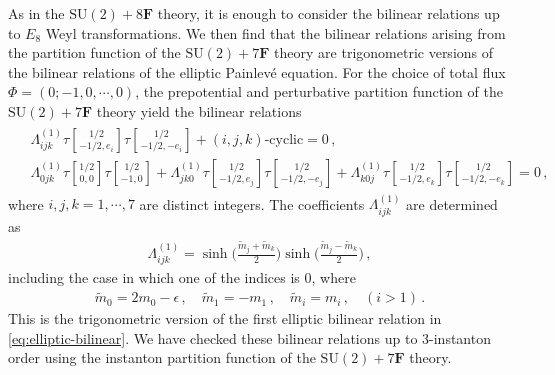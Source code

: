 \documentclass[11pt, a4paper]{article}
\newcommand{\tauftn}[2]{\tau\genfrac[]{0pt}{1}{#1}{#2}}
\theoremstyle{definition}
\begin{document}
As in the $ \mathrm{SU}(2)+8\mathbf{F} $ theory, it is enough to consider the bilinear relations up to $ E_8 $ Weyl transformations. We then find that the bilinear relations arising from the partition function of the $ \mathrm{SU}(2)+7\mathbf{F} $ theory are trigonometric versions of the bilinear relations of the elliptic Painlev\'e equation. For the choice of total flux $ \Phi = (0; -1,0,\cdots,0) $, the prepotential and perturbative partition function of the $ \mathrm{SU}(2)+7\mathbf{F} $ theory yield the bilinear relations
\begin{align}
    \begin{aligned}
        &\Lambda_{ijk}^{(1)} \tauftn{1/2}{-1/2,e_i} \tauftn{1/2}{-1/2,-e_i} + (i,j,k)\text{-cyclic} = 0 \, , \\
        &\Lambda_{0jk}^{(1)}\tauftn{1/2}{0,0} \tauftn{1/2}{-1,0} + \Lambda_{jk0}^{(1)} \tauftn{1/2}{-1/2,e_j} \tauftn{1/2}{-1/2,-e_j} + \Lambda_{k0j}^{(1)} \tauftn{1/2}{-1/2,e_k} \tauftn{1/2}{-1/2,-e_k} = 0  \, ,
    \end{aligned}
\end{align}
where $ i,j,k=1,\cdots,7 $ are distinct integers. The coefficients $ \Lambda_{ijk}^{(1)} $ are determined as
\begin{align}\label{eq:7F-bilinear1}
    \Lambda_{ijk}^{(1)} = \sinh\Big(\frac{\tilde{m}_j + \tilde{m}_k}{2}\Big) \sinh\Big(\frac{\tilde{m}_j - \tilde{m}_k}{2}\Big) \, ,
\end{align}
including the case in which one of the indices is $ 0 $, where
\begin{align}\label{eq:7F-tildem}
    \tilde{m}_0 = 2m_0 - \epsilon \, , \quad
    \tilde{m}_1 = -m_1 \, , \quad
    \tilde{m}_i = m_i \, , \quad (i>1) \, .
\end{align}
This is the trigonometric version of the first elliptic bilinear relation in \eqref{eq:elliptic-bilinear}. We have checked these bilinear relations up to 3-instanton order using the instanton partition function of the $ \mathrm{SU}(2)+7\mathbf{F} $ theory.
\end{document}
